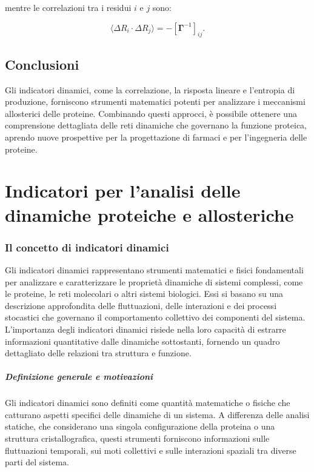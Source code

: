 \documentclass[Lau,binding=0.6cm,oneside,noexaminfo]{sapthesis}
\begin{document}
mentre le correlazioni tra i residui $i$ e $j$ sono:

\begin{equation}
\langle \Delta R_i \cdot \Delta R_j \rangle = -\left[ \mathbf{\Gamma}^{-1} \right]_{ij}.
\end{equation}
\section{Conclusioni}
Gli indicatori dinamici, come la correlazione, la risposta lineare e l’entropia di produzione, forniscono strumenti matematici potenti per analizzare i meccanismi allosterici delle proteine. Combinando questi approcci, è possibile ottenere una comprensione dettagliata delle reti dinamiche che governano la funzione proteica, aprendo nuove prospettive per la progettazione di farmaci e per l'ingegneria delle proteine.


\chapter{Indicatori per l'analisi delle dinamiche proteiche e allosteriche}
\subsection{Il concetto di indicatori dinamici}

Gli indicatori dinamici rappresentano strumenti matematici e fisici fondamentali per analizzare e caratterizzare le proprietà dinamiche di sistemi complessi, come le proteine, le reti molecolari o altri sistemi biologici. Essi si basano su una descrizione approfondita delle fluttuazioni, delle interazioni e dei processi stocastici che governano il comportamento collettivo dei componenti del sistema. L'importanza degli indicatori dinamici risiede nella loro capacità di estrarre informazioni quantitative dalle dinamiche sottostanti, fornendo un quadro dettagliato delle relazioni tra struttura e funzione.

\paragraph{Definizione generale e motivazioni}
Gli indicatori dinamici sono definiti come quantità matematiche o fisiche che catturano aspetti specifici delle dinamiche di un sistema. A differenza delle analisi statiche, che considerano una singola configurazione della proteina o una struttura cristallografica, questi strumenti forniscono informazioni sulle fluttuazioni temporali, sui moti collettivi e sulle interazioni spaziali tra diverse parti del sistema.
\end{document}
